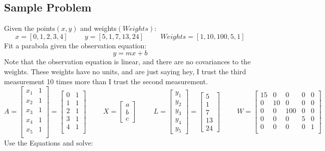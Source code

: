 \subsection{Sample Problem}
Given the points$(x,y)$ and weights$(Weights)$: 
\[
x = [0,1,2,3,4] \hspace{1cm} y = [5,1,7,13,24] \hspace{1cm} Weights = [1,10,100,5,1]
\]
Fit a parabola given the observation equation:
\[
y = m x +b
\]
Note that the observation equation is linear, and there are no covariances to the weights.  These weights have no units, and are just saying hey, I trust the third measurement 10 times more than I trust the second measurement.
\[
A = \begin{bmatrix}
x_1 & 1 \\
x_2 & 1 \\
x_3 & 1 \\
x_4 & 1 \\
x_5 & 1 \\
\end{bmatrix} =
\begin{bmatrix}
0 & 1 \\
1 & 1 \\
2 & 1 \\
3 & 1 \\
4 & 1 \\
\end{bmatrix}
\hspace{1cm}
X = 
\begin{bmatrix}
a \\ b \\ c 
\end{bmatrix}
\hspace{1cm}
L =
\begin{bmatrix}
y_1 \\ y_2 \\ y_3 \\ y_4 \\ y_5
\end{bmatrix} = 
\begin{bmatrix}
5 \\ 1 \\ 7 \\ 13 \\ 24
\end{bmatrix}
\hspace{1cm}
W = 
\begin{bmatrix}
15 & 0 & 0 & 0 & 0 \\
0 & 10 & 0 & 0 & 0 \\
0 & 0 & 100 & 0 & 0 \\
0 & 0 & 0 & 5 & 0 \\
0 & 0 & 0 & 0 & 1 \\
\end{bmatrix}
\]
Use the Equations and solve:


